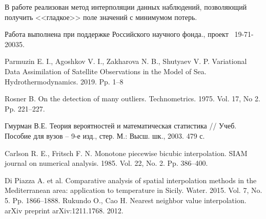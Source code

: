   

В работе реализован метод интерполяции данных наблюдений, позволяющий получить <<гладкое>> поле значений с минимумом потерь.
 
Работа выполнена при поддержке Российского научного фонда., проект \textnumero~19-71-20035.
 



\begin{thebibliography}{9} %
 Parmuzin  E. I., Agoshkov  V. I.,  Zakharova  N. B., Shutyaev  V. P. Variational Data Assimilation of Satellite Observations in the Model of Sea. Hydrothermodynamics. 2019. Pp. 1--8 

 Rosner  B. On the detection of many outliers. Technometrics. 1975. Vol. 17, No 2. Pp. 221--227.

 Гмурман В.Е. Теория вероятностей и математическая статистика // Учеб. Пособие для вузов – 9-е изд., стер. М.: Высш. шк., 2003. 479 с.

 Carlson R. E., Fritsch F. N. Monotone piecewise bicubic interpolation. SIAM journal on numerical analysis.  1985.  Vol. 22, No. 2. Pp. 386--400.

 Di Piazza A. et al. Comparative analysis of spatial interpolation methods in the Mediterranean area: application to temperature in Sicily. Water.  2015.  Vol. 7, No. 5.  Pp. 1866--1888.
 Rukundo O., Cao H. Nearest neighbor value interpolation. arXiv preprint arXiv:1211.1768.  2012.


\end{thebibliography}





%

